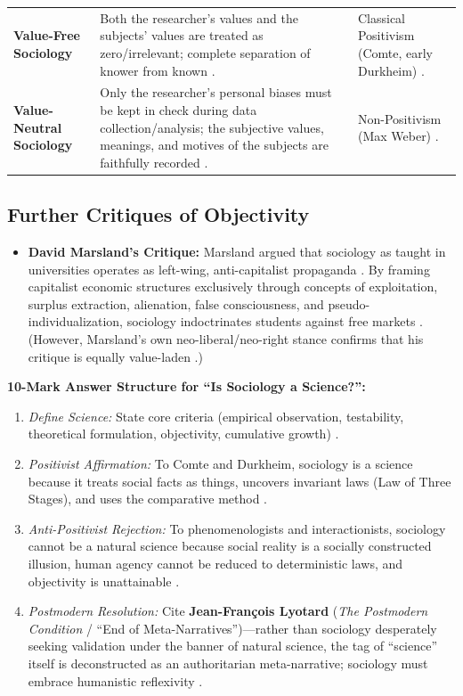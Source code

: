 \vspace{6pt}
\noindent
\begin{tabularx}{\textwidth}{p{3.8cm} Y Y}
\toprule
{}
 &  &  \\
\midrule
\textbf{Value-Free Sociology} & Both the researcher's values and the subjects' values are treated as zero/irrelevant; complete separation of knower from known . & Classical Positivism (Comte, early Durkheim) . \\
\textbf{Value-Neutral Sociology} & Only the researcher's personal biases must be kept in check during data collection/analysis; the subjective values, meanings, and motives of the subjects are faithfully recorded . & Non-Positivism (Max Weber) . \\
\bottomrule
\end{tabularx}
\vspace{6pt}

\subsection{Further Critiques of Objectivity}
\begin{itemize}
    \item \textbf{David Marsland's Critique:} Marsland argued that sociology as taught in universities operates as left-wing, anti-capitalist propaganda . By framing capitalist economic structures exclusively through concepts of exploitation, surplus extraction, alienation, false consciousness, and pseudo-individualization, sociology indoctrinates students against free markets . (However, Marsland's own neo-liberal/neo-right stance confirms that his critique is equally value-laden .)
\end{itemize}

\begin{PYQLink}
\textbf{10-Mark Answer Structure for ``Is Sociology a Science?'':}
\begin{enumerate}
    \item \textit{Define Science:} State core criteria (empirical observation, testability, theoretical formulation, objectivity, cumulative growth) .
    \item \textit{Positivist Affirmation:} To Comte and Durkheim, sociology is a science because it treats social facts as things, uncovers invariant laws (Law of Three Stages), and uses the comparative method .
    \item \textit{Anti-Positivist Rejection:} To phenomenologists and interactionists, sociology cannot be a natural science because social reality is a socially constructed illusion, human agency cannot be reduced to deterministic laws, and objectivity is unattainable .
    \item \textit{Postmodern Resolution:} Cite \textbf{Jean-François Lyotard} (\textit{The Postmodern Condition} / ``End of Meta-Narratives'')---rather than sociology desperately seeking validation under the banner of natural science, the tag of ``science'' itself is deconstructed as an authoritarian meta-narrative; sociology must embrace humanistic reflexivity .
\end{enumerate}
\end{PYQLink}

